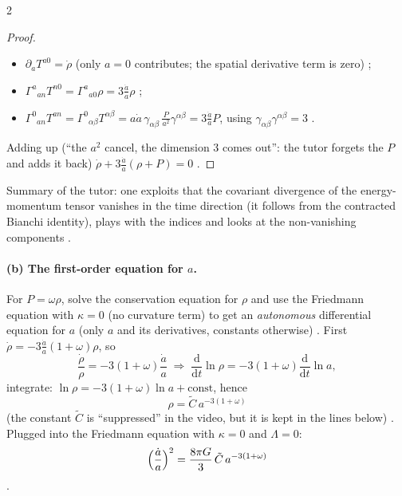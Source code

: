 \begin{paracol}{2}
\begin{proof}
\begin{itemize}
  \item $\partial_aT^{a0}=\dot\rho$ (only $a=0$ contributes; the spatial derivative term is zero) ;
  \item $\Gamma^a{}_{an}T^{n0}=\Gamma^a{}_{a0}\rho=3\frac{\dot a}a\rho$ ;
  \item $\Gamma^0{}_{an}T^{an}=\Gamma^0{}_{\alpha\beta}T^{\alpha\beta}=a\dot a\,\gamma_{\alpha\beta}\,\frac P{a^2}\gamma^{\alpha\beta}=3\frac{\dot a}aP$, using $\gamma_{\alpha\beta}\gamma^{\alpha\beta}=3$ .
\end{itemize}
Adding up (``the $a^2$ cancel, the dimension $3$ comes out'': the tutor forgets the $P$ and adds it back) $\dot\rho+3\frac{\dot a}a(\rho+P)=0$ .
\end{proof}
Summary of the tutor: one exploits that the covariant divergence of the energy-momentum tensor vanishes in the time direction (it follows from the contracted Bianchi identity), plays with the indices and looks at the non-vanishing components .

\paragraph{(b) The first-order equation for $a$.} For $P=\omega\rho$, solve the conservation equation for $\rho$ and use the Friedmann equation with $\kappa=0$ (no curvature term) to get an \emph{autonomous} differential equation for $a$ (only $a$ and its derivatives, constants otherwise) . First $\dot\rho=-3\frac{\dot a}a(1+\omega)\rho$, so
\[
  \frac{\dot\rho}{\rho}=-3(1+\omega)\frac{\dot a}a\;\Longrightarrow\;\frac{\mathrm d}{\mathrm dt}\ln\rho=-3(1+\omega)\frac{\mathrm d}{\mathrm dt}\ln a,
\]
integrate: $\ln\rho=-3(1+\omega)\ln a+\text{const}$, hence
\[
  \rho=\tilde C\,a^{-3(1+\omega)}
\]
(the constant $\tilde C$ is ``suppressed'' in the video, but it is kept in the lines below) . Plugged into the Friedmann equation with $\kappa=0$ and $\Lambda=0$:
\begin{equation}\label{eq:c21-auto}
  \Bigl(\frac{\dot a}a\Bigr)^2=\frac{8\pi G}3\,\tilde C\,a^{-3(1+\omega)}
\end{equation}
.


\end{paracol}
